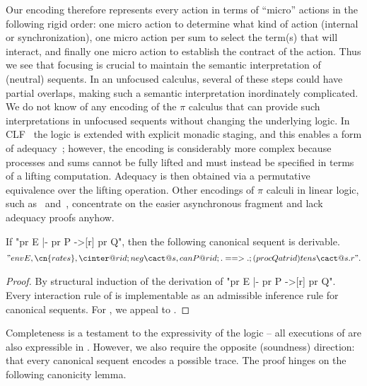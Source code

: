 \documentclass{article}
\begin{document}
Our encoding therefore represents every \spi action in terms of ``micro''
actions in the following rigid order: one micro action to determine what kind of
action (internal or synchronization), one micro action per sum to select the
term(s) that will interact, and finally one micro action to establish the
contract of the action. Thus we see that focusing is crucial to maintain the
semantic interpretation of (neutral) sequents. In an unfocused calculus, several
of these steps could have partial overlaps, making such a semantic
interpretation inordinately complicated. We do not know of any encoding of the
$\pi$ calculus that can provide such interpretations in unfocused sequents
without changing the underlying logic. In CLF~\cite{cervesato03tr} the logic is
extended with explicit monadic staging, and this enables a form of
adequacy~\cite{cervesato03tr}; however, the encoding is considerably more
complex because processes and sums cannot be fully lifted and must instead be
specified in terms of a lifting computation. Adequacy is then obtained via a
permutative equivalence over the lifting operation. Other encodings of $\pi$
calculi in linear logic, such as~\cite{garg05concur} and~\cite{baelde05stage},
concentrate on the easier asynchronous fragment and lack adequacy proofs anyhow.

\def\sproc{\set{proc}}
\def\ssum{\set{sum}}
\def\sinter{\set{inter}}

\begin{thm}[completeness] \label{thm:completeness} If "pr E |- pr P ->[r] pr Q", then the following canonical sequent is derivable.
  \begin{gather*}
    "env{E}, \cn{rates}, \cinter @ rid ; neg \cact @ s, can P @ rid ; . ==> . ; (proc Q at rid) tens \cact @ {s . r}".
  \end{gather*}
\end{thm}

\begin{proof}
  By structural induction of the derivation of "pr E |- pr P ->[r] pr Q". Every
  interaction rule of \spi is implementable as an admissible inference rule for
  canonical sequents. For , we appeal to .
\end{proof}

Completeness is a testament to the expressivity of the logic -- all executions
of \spi are also expressible in \hyll. However, we also require the opposite
(soundness) direction: that every canonical sequent encodes a possible \spi
trace. The proof hinges on the following canonicity lemma.
\end{document}
